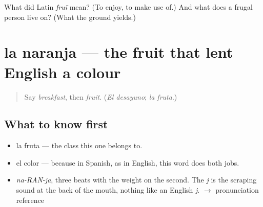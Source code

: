 \begin{tcolorbox}[breakable,colback=teal!4,colframe=teal!35!black,title={Before you move on}]
What did Latin \emph{fruī} mean? (To enjoy, to make use of.) And what does a frugal person live on? (What the ground yields.)
\end{tcolorbox}
\section[la naranja]{la naranja — the fruit that lent English a colour}

\label{lesson:ES-C367-naranja}



\begin{quote}
Say \emph{breakfast}, then \emph{fruit}. (\emph{El desayuno}; \emph{la fruta}.)
\end{quote}

\subsection*{What to know first}
\begin{itemize}
\raggedright
  \item la fruta — the class this one belongs to.
  \item el color — because in Spanish, as in English, this word does both jobs.
\end{itemize}

\begin{sounds}
\begin{itemize}
\raggedright
  \item \emph{na-RAN-ja}, three beats with the weight on the second. The \emph{j} is the scraping sound at the back of the mouth, nothing like an English \emph{j}. $\to$ pronunciation reference
\end{itemize}
\end{sounds}

